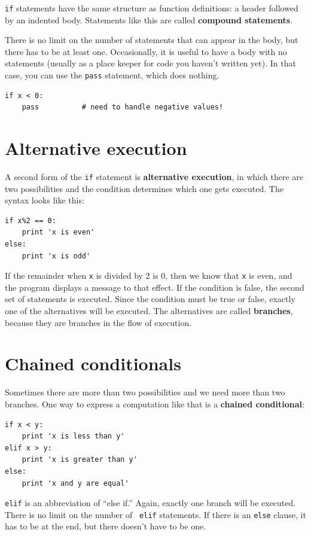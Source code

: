 \documentclass[10pt]{book}
\begin{document}
{\tt if} statements have the same structure as function definitions:
a header followed by an indented body.  Statements like this are
called {\bf compound statements}.

There is no limit on the number of statements that can appear in
the body, but there has to be at least one.
Occasionally, it is useful to have a body with no statements (usually
as a place keeper for code you haven't written yet).  In that
case, you can use the {\tt pass} statement, which does nothing.

\begin{verbatim}
if x < 0:
    pass          # need to handle negative values!
\end{verbatim}
%

\section{Alternative execution}
\label{alternative.execution}

A second form of the {\tt if} statement is {\bf alternative execution},
in which there are two possibilities and the condition determines
which one gets executed.  The syntax looks like this:

\begin{verbatim}
if x%2 == 0:
    print 'x is even'
else:
    print 'x is odd'
\end{verbatim}
%
If the remainder when {\tt x} is divided by 2 is 0, then we
know that {\tt x} is even, and the program displays a message to that
effect.  If the condition is false, the second set of statements is
executed.  Since the condition must be true or false, exactly one of
the alternatives will be executed.  The alternatives are called
{\bf branches}, because they are branches in the flow of execution.



\section{Chained conditionals}

Sometimes there are more than two possibilities and we need more than
two branches.  One way to express a computation like that is a {\bf
chained conditional}:

\begin{verbatim}
if x < y:
    print 'x is less than y'
elif x > y:
    print 'x is greater than y'
else:
    print 'x and y are equal'
\end{verbatim}
%
{\tt elif} is an abbreviation of ``else if.''  Again, exactly one
branch will be executed.  There is no limit on the number of {\tt
elif} statements.  If there is an {\tt else} clause, it has to be
at the end, but there doesn't have to be one.
\end{document}
